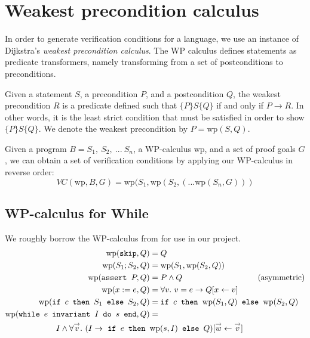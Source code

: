 \section{Weakest precondition calculus} %

In order to generate verification conditions for a language,
we use an instance of Dijkstra's \textit{weakest precondition calculus}.
The WP calculus defines statements as predicate transformers,
namely transforming from a set of postconditions to preconditions.

\newcommand{\wpp}{\mathrm{wp}}
\renewcommand{\implies}{\rightarrow}

Given a statement $S$, a precondition $P$, and a postcondition $Q$,
the weakest precondition $R$ is a predicate defined
such that $\{P\} S \{Q\}$ if and only if $P \implies R$.
In other words, it is the least strict condition that must be satisfied
in order to show $\{P\} S \{Q\}$.
We denote the weakest precondition by $P = \wpp(S, Q)$.

Given a program $B = S_1,~S_2,~...~S_n$, a WP-calculus $\wpp$, and a set of proof goals $G$,
we can obtain a set of verification conditions by applying our WP-calculus in reverse order:
\[
    VC(\wpp, B, G) = \wpp(S_1, \wpp(S_2, (... \wpp(S_n, G)))
\]

\subsection{WP-calculus for While} \label{sec:whilewp}

We roughly borrow the WP-calculus from \cite{jlamp} for use in our project.
\begin{align}
    \wpp(\inl{skip}, Q) &= Q \\
    \wpp(S_1; S_2, Q) &= \wpp(S_1, \wpp(S_2, Q)) \\
    \wpp(\inl{assert } P, Q) &= P \land Q ~~~~~~~~~~~~~~~~~~~~~~~~~~~~(\text{asymmetric})\\
    \wpp(x := e, Q) &= \forall v.~v = e \implies Q[x \leftarrow v] \\
    \wpp(\inl{if } c \inl{ then } S_1 \inl{ else } S_2, Q) &=
        \inl{if } c \inl{ then } \wpp(S_1, Q) \inl{ else } \wpp(S_2, Q) \\
    \wpp(\inl{while } e \inl{ invariant } I \inl{ do } s \inl{ end}, Q) &=\\
        I \land \forall \overset{\rightarrow} v. ~
        (I \implies \
        \inl{if } e \inl{ then } &\wpp(s, I) \inl{ else } Q)
        [\overset{\rightarrow} w \leftarrow \overset{\rightarrow} v]
\end{align}

